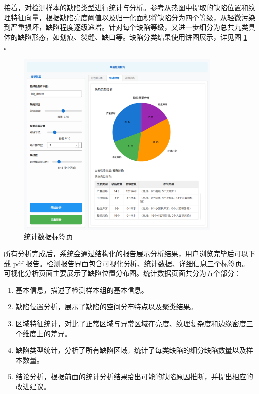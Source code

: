 \documentclass[
  ]{njuthesis}
\begin{document}
接着，对检测样本的缺陷类型进行统计与分析。参考从热图中提取的缺陷位置和纹理特征向量，根据缺陷亮度阈值以及归一化面积将缺陷分为四个等级，从轻微污染到严重损坏，缺陷程度逐级递增。针对每个缺陷等级，又进一步细分为总共九类具体的缺陷形态，如划痕、裂缝、缺口等。缺陷分类结果使用饼图展示，详见图 \ref{统计数据标签页} 。

\begin{figure}[htb]
    \centering
    \includegraphics[width=0.88\textwidth]{images/统计数据标签页.png}
    \caption{统计数据标签页}
    \label{统计数据标签页}
\end{figure}

所有分析完成后，系统会通过结构化的报告展示分析结果，用户浏览完毕后可以下载 pdf 报告。检测报告界面包含可视化分析、统计数据、详细信息三个标签页。可视化分析页面主要展示了缺陷位置分布图。统计数据页面共分为五个部分：

\begin{enumerate}
    \item 基本信息，描述了检测样本组的基本信息。
    \item 缺陷位置分析，展示了缺陷的空间分布特点以及聚类结果。
    \item 区域特征统计，对比了正常区域与异常区域在亮度、纹理复杂度和边缘密度三个维度上的差异。
    \item 缺陷类型统计，分析了所有缺陷区域，统计了每类缺陷的细分缺陷数量以及样本数量。
    \item 结论分析，根据前面的统计分析结果给出可能的缺陷原因推断，并提出相应的改进建议。
\end{enumerate}
\end{document}
